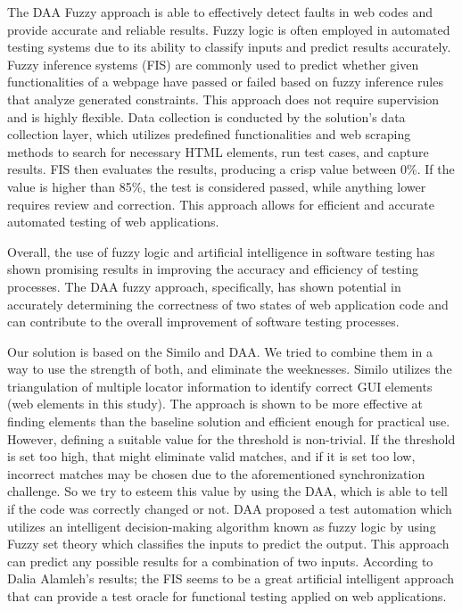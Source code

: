 \documentclass{article}
\begin{document}
The DAA Fuzzy approach\cite{fuzzy_ai_in_web_testing} is able to effectively detect faults in web codes and provide accurate and reliable results. Fuzzy logic is often employed in automated testing systems due to its ability to classify inputs and predict results accurately. Fuzzy inference systems (FIS) are commonly used to predict whether given functionalities of a webpage have passed or failed based on fuzzy inference rules that analyze generated constraints. This approach does not require supervision and is highly flexible. Data collection is conducted by the solution's data collection layer, which utilizes predefined functionalities and web scraping methods to search for necessary HTML elements, run test cases, and capture results. FIS then evaluates the results, producing a crisp value between 0\%. If the value is higher than 85\%, the test is considered passed, while anything lower requires review and correction. This approach allows for efficient and accurate automated testing of web applications.

Overall, the use of fuzzy logic\cite{fuzzy_logic} and artificial intelligence in software testing has shown promising results in improving the accuracy and efficiency of testing processes. The DAA fuzzy approach, specifically, has shown potential in accurately determining the correctness of two states of web application code and can contribute to the overall improvement of software testing processes.

Our solution is based on the Similo\cite{similo} and DAA\cite{fuzzy_ai_in_web_testing}. We tried to combine them in a way to use the strength of both, and eliminate the weeknesses. Similo\cite{similo} utilizes the triangulation of multiple locator information to identify correct GUI elements (web elements in this study). The approach is shown to be more effective at finding elements than the baseline solution and efficient enough for practical use. However, defining a suitable value for the threshold is non-trivial. If the threshold is set too high, that might eliminate valid matches, and if it is set too low, incorrect matches may be chosen due to the aforementioned synchronization challenge. So we try to esteem this value by using the DAA\cite{fuzzy_ai_in_web_testing}, which is able to tell if the code was correctly changed or not. DAA\cite{fuzzy_ai_in_web_testing} proposed a test automation which utilizes an intelligent decision-making algorithm known as fuzzy logic by using Fuzzy set theory which classifies the inputs to predict the output. This approach can predict any possible results for a combination of two inputs. According to Dalia Alamleh's results\cite{fuzzy_ai_in_web_testing}; the FIS\cite{fuzzy_logic} seems to be a great artificial intelligent approach that can provide a test oracle for functional testing applied on web applications.
\end{document}
